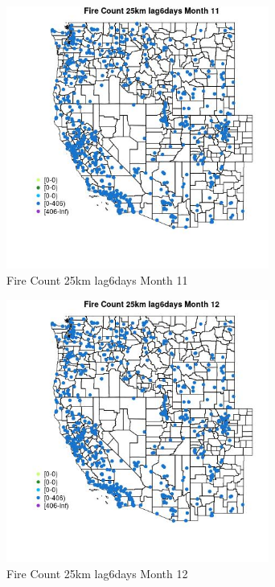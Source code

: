 \begin{figure} 
\centering  
\includegraphics[width=0.77\textwidth]{Code_Outputs/Report_ML_input_PM25_Step4_part_f_de_duplicated_aveswNAs_MapObsMo11Fire_Count_25km_lag6days.jpg} 
\caption{\label{fig:Report_ML_input_PM25_Step4_part_f_de_duplicated_aveswNAsMapObsMo11Fire_Count_25km_lag6days}Fire Count 25km lag6days Month 11} 
\end{figure} 
 

\begin{figure} 
\centering  
\includegraphics[width=0.77\textwidth]{Code_Outputs/Report_ML_input_PM25_Step4_part_f_de_duplicated_aveswNAs_MapObsMo12Fire_Count_25km_lag6days.jpg} 
\caption{\label{fig:Report_ML_input_PM25_Step4_part_f_de_duplicated_aveswNAsMapObsMo12Fire_Count_25km_lag6days}Fire Count 25km lag6days Month 12} 
\end{figure} 
 

